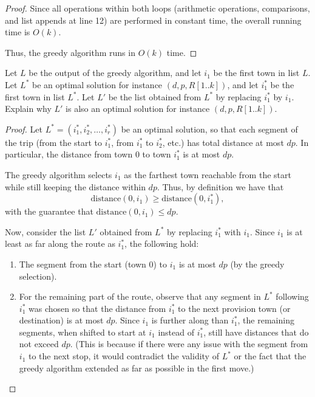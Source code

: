 \documentclass[11pt,fleqn]{exam}
\newenvironment{soln}{\color{solnblue}}{}
\newif\ifsolutions\solutionsfalse
\begin{document}
\begin{questions}
\begin{soln}
\begin{proof}
   Since all operations within both loops (arithmetic operations, comparisons, and list appends at line 12) 
   are performed in constant time, the overall running time is \( O(k) \).
   
   Thus, the greedy algorithm runs in \( O(k) \) time.
\end{proof}
\end{soln}


\ifsolutions

\fi

\clearpage
\question[3]
Let $L$ be the output of the greedy algorithm, and let $i_1$ be the
first town in list $L$.  Let $L^*$ be an optimal solution for instance
$(d,p,R[1..k])$, and let $i_1^*$ be the first town in list $L^*$.  Let
$L'$ be the list obtained from $L^*$ by replacing $i_1^*$ by $i_1$.
Explain why $L'$ is also an optimal solution for instance
$(d,p,R[1..k])$.

\begin{soln}
   \begin{proof}
   Let \( L^* = \left( i_1^*, i_2^*, \dots, i_r^* \right) \) 
   be an optimal solution, so that each segment of the trip 
   (from the start to \( i_1^* \), from \( i_1^* \) to \( i_2^* \), etc.) has 
   total distance at most \( dp \). In particular, the distance from town 
   \( 0 \) to town \( i_1^* \) is at most \( dp \).
   
   The greedy algorithm selects \( i_1 \) as the farthest town reachable from 
   the start while still keeping the distance within \( dp \). Thus, 
   by definition we have that
   \[
   \text{distance}(0, i_1) \ge \text{distance}(0, i_1^*),
   \]
   with the guarantee that \(\text{distance}(0, i_1) \le dp\).
   
   Now, consider the list \( L' \) obtained from \( L^* \) by replacing \( i_1^* \)
    with \( i_1 \). Since \( i_1 \) is at least as far along the route as \( i_1^* \), 
    the following hold:
   \begin{enumerate}
       \item The segment from the start (town 0) to \( i_1 \) is at most \( dp \) (by the greedy selection).
       \item For the remaining part of the route, observe that any segment in \( L^* \) 
       following \( i_1^* \) was chosen so that the distance from \( i_1^* \) to the next 
       provision town (or destination) is at most \( dp \). Since \( i_1 \) is further along 
       than \( i_1^* \), the remaining segments, when shifted to start at \( i_1 \) instead 
       of \( i_1^* \), still have distances that do not exceed \( dp \). (This is because if 
       there were any issue with the segment from \( i_1 \) to the next stop, it would contradict 
       the validity of \( L^* \) or the fact that the greedy algorithm extended as far as possible 
       in the first move.)
   \end{enumerate}
   

\end{proof}
\end{soln}
\end{questions}
\end{document}
